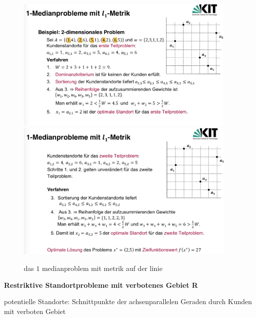       \begin{figure}[H]
        \centering
        \includegraphics[width=0.95\textwidth]{Images/das_1_medianproblem_mit_metrik_auf_der_linie_Bsp(1).png}
        \includegraphics[width=0.95\textwidth]{Images/das_1_medianproblem_mit_metrik_auf_der_linie_Bsp(2).png}
        \caption{das $1$ medianproblem mit metrik auf der linie}
        \label{fig:das_1_medianproblem_mit_metrik_auf_der_linie}
      \end{figure}

      \textbf{Restriktive Standortprobleme mit verbotenes Gebiet R}

      \par potentielle Standorte: Schnittpunkte der achsenparallelen Geraden durch Kunden mit verboten Gebiet

      \begin{exmp}
        \color{blue}{Aufgabe 7(b)}
      \end{exmp}



